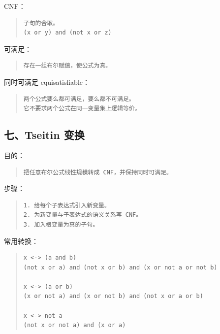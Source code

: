 \documentclass[UTF8,zihao=-4]{ctexart}
\begin{document}
CNF：


\begin{quote}
\footnotesize
\begin{verbatim}
子句的合取。
(x or y) and (not x or z)
\end{verbatim}
\end{quote}


可满足：


\begin{quote}
\footnotesize
\begin{verbatim}
存在一组布尔赋值，使公式为真。
\end{verbatim}
\end{quote}


同时可满足 equisatisfiable：


\begin{quote}
\footnotesize
\begin{verbatim}
两个公式要么都可满足，要么都不可满足。
它不要求两个公式在同一变量集上逻辑等价。
\end{verbatim}
\end{quote}


\subsection{七、Tseitin 变换}


目的：


\begin{quote}
\footnotesize
\begin{verbatim}
把任意布尔公式线性规模转成 CNF，并保持同时可满足。
\end{verbatim}
\end{quote}


步骤：


\begin{quote}
\footnotesize
\begin{verbatim}
1. 给每个子表达式引入新变量。
2. 为新变量与子表达式的语义关系写 CNF。
3. 加入根变量为真的子句。
\end{verbatim}
\end{quote}


常用转换：


\begin{quote}
\footnotesize
\begin{verbatim}
x <-> (a and b)
(not x or a) and (not x or b) and (x or not a or not b)

x <-> (a or b)
(x or not a) and (x or not b) and (not x or a or b)

x <-> not a
(not x or not a) and (x or a)
\end{verbatim}
\end{quote}
\end{document}
